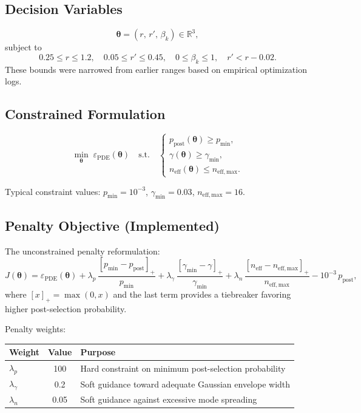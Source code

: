 \documentclass[11pt]{article}
\newcommand{\eps}{\varepsilon}
\begin{document}
\subsection{Decision Variables}
\begin{equation}
\bm{\theta} = (r,\, r',\, \beta_k) \in \mathbb{R}^3,
\end{equation}
subject to
\begin{equation}
0.25 \leq r \leq 1.2,\quad 0.05 \leq r' \leq 0.45,\quad
0 \leq \beta_k \leq 1,\quad r' < r - 0.02.
\end{equation}
These bounds were narrowed from earlier ranges based on empirical optimization logs.

\subsection{Constrained Formulation}
\begin{equation}\label{eq:constrained}
\min_{\bm{\theta}}\; \eps_{\mathrm{PDE}}(\bm{\theta})
\quad\text{s.t.}\quad
\begin{cases}
p_{\mathrm{post}}(\bm{\theta}) \geq p_{\min}, \\
\gamma(\bm{\theta}) \geq \gamma_{\min}, \\
n_{\mathrm{eff}}(\bm{\theta}) \leq n_{\mathrm{eff,max}}.
\end{cases}
\end{equation}

Typical constraint values: $p_{\min}=10^{-3}$, $\gamma_{\min}=0.03$, $n_{\mathrm{eff,max}}=16$.

\subsection{Penalty Objective (Implemented)}
The unconstrained penalty reformulation:
\begin{equation}\label{eq:penalty}
\boxed{
J(\bm{\theta}) = \eps_{\mathrm{PDE}}(\bm{\theta})
+ \lambda_p\,\frac{[p_{\min} - p_{\mathrm{post}}]_+}{p_{\min}}
+ \lambda_\gamma\,\frac{[\gamma_{\min} - \gamma]_+}{\gamma_{\min}}
+ \lambda_n\,\frac{[n_{\mathrm{eff}} - n_{\mathrm{eff,max}}]_+}{n_{\mathrm{eff,max}}}
- 10^{-3}\,p_{\mathrm{post}},
}
\end{equation}
where $[x]_+ = \max(0,x)$ and the last term provides a tiebreaker favoring higher
post-selection probability.

Penalty weights:
\begin{center}
\begin{tabular}{lcl}
\toprule
Weight & Value & Purpose \\
\midrule
$\lambda_p$ & 100 & Hard constraint on minimum post-selection probability \\
$\lambda_\gamma$ & 0.2 & Soft guidance toward adequate Gaussian envelope width \\
$\lambda_n$ & 0.05 & Soft guidance against excessive mode spreading \\
\bottomrule
\end{tabular}
\end{center}
\end{document}
